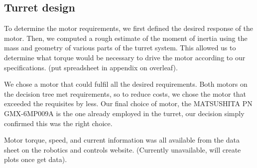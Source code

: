 ﻿\subsection{Turret design}

To determine the motor requirements, we first defined the desired response of the motor. Then, we computed a rough estimate of the moment of inertia using the mass and geometry of various parts of the turret system. This allowed us to determine what torque would be necessary to drive the motor according to our specifications. (put spreadsheet in appendix on overleaf).

We chose a motor that could fulfil all the desired requirements. Both motors on the decision tree met requirements, so to reduce costs, we chose the motor that exceeded the requisites by less. Our final choice of motor, the MATSUSHITA PN GMX-6MP009A is the one already employed in the turret, our decision simply confirmed this was the right choice. 

Motor torque, speed, and current information was all available from the data sheet on the robotics and controls website. (Currently unavailable, will create plots once get data).

